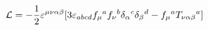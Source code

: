 \begin{equation}
{\cal L} = - \frac{1}{2} \varepsilon^{\mu\nu\alpha\beta} [ 3
\varepsilon_{abcd} f_\mu{}^a f_\nu{}^b \delta_\alpha{}^c
\delta_\beta{}^d - f_\mu{}^a T_{\nu\alpha\beta}{}^a ]
\end{equation}

